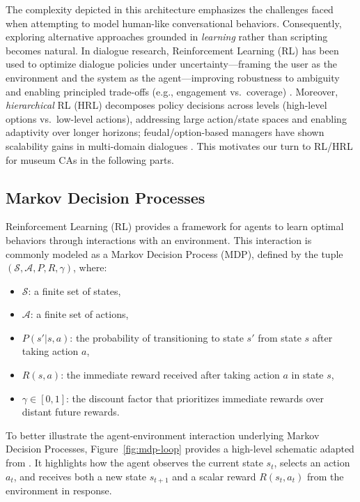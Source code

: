 \documentclass[12pt]{article}
\begin{document}
The complexity depicted in this architecture emphasizes the challenges faced when attempting to model human-like conversational behaviors. Consequently, exploring alternative approaches grounded in \emph{learning} rather than scripting becomes natural. In dialogue research, Reinforcement Learning (RL) has been used to optimize dialogue policies under uncertainty—framing the user as the environment and the system as the agent—improving robustness to ambiguity and enabling principled trade-offs (e.g., engagement vs.\ coverage) \citep{williams2007pomdp,kwan2023dplsurvey}. Moreover, \emph{hierarchical} RL (HRL) decomposes policy decisions across levels (high-level options vs.\ low-level actions), addressing large action/state spaces and enabling adaptivity over longer horizons; feudal/option-based managers have shown scalability gains in multi-domain dialogues \citep{casanueva2018feudal,weisz2018sample,su2017sample}. This motivates our turn to RL/HRL for museum CAs in the following parts.\\

\subsection{Markov Decision Processes}

Reinforcement Learning (RL) provides a framework for agents to learn optimal behaviors through interactions with an environment. This interaction is commonly modeled as a Markov Decision Process (MDP), defined by the tuple $(\mathcal{S}, \mathcal{A}, P, R, \gamma)$, where:

\begin{itemize}
    \item $\mathcal{S}$: a finite set of states,
    \item $\mathcal{A}$: a finite set of actions,
    \item $P(s'|s,a)$: the probability of transitioning to state $s'$ from state $s$ after taking action $a$,
    \item $R(s,a)$: the immediate reward received after taking action $a$ in state $s$,
    \item $\gamma \in [0,1]$: the discount factor that prioritizes immediate rewards over distant future rewards.
\end{itemize}

To better illustrate the agent-environment interaction underlying Markov Decision Processes, Figure~\ref{fig:mdp-loop} provides a high-level schematic adapted from \citet{sutton2018reinforcement}. It highlights how the agent observes the current state $s_t$, selects an action $a_t$, and receives both a new state $s_{t+1}$ and a scalar reward $R(s_t, a_t)$ from the environment in response.
\end{document}
